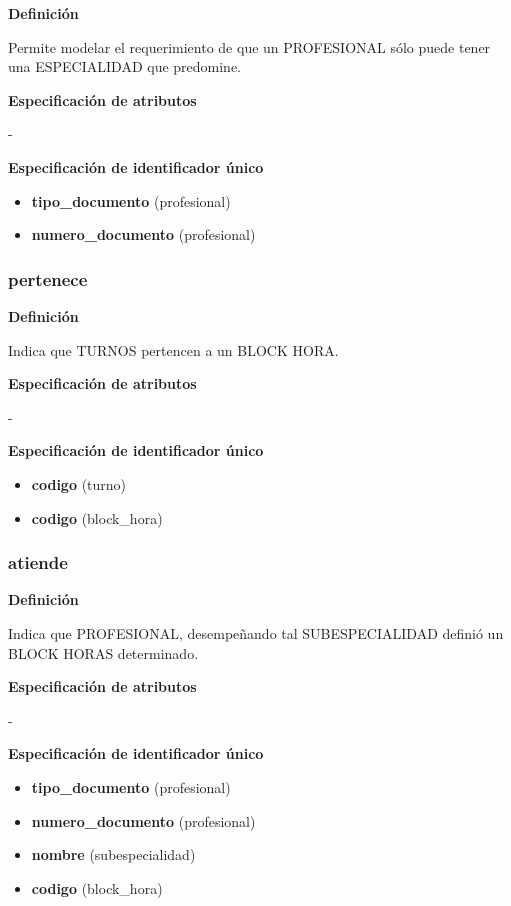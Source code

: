 \documentclass[a4paper,11pt]{article}
\begin{document}
\textbf{Definición}

Permite modelar el requerimiento de que un PROFESIONAL sólo puede tener una ESPECIALIDAD 
que predomine.

\textbf{Especificación de atributos}

-

\textbf{Especificación de identificador único}

\begin{itemize}

     \item \textbf{tipo\_documento} (profesional)

     \item \textbf{numero\_documento} (profesional)

\end{itemize}

\subsubsection{\textbf{pertenece}}

\textbf{Definición}

Indica que TURNOS pertencen a un BLOCK HORA.

\textbf{Especificación de atributos}

-

\textbf{Especificación de identificador único}

\begin{itemize}

     \item \textbf{codigo} (turno)

     \item \textbf{codigo} (block\_hora)

\end{itemize}

\subsubsection{\textbf{atiende}}

\textbf{Definición}

Indica que PROFESIONAL, desempeñando tal SUBESPECIALIDAD definió un BLOCK 
HORAS determinado.

\textbf{Especificación de atributos}

-

\textbf{Especificación de identificador único}

\begin{itemize}

     \item \textbf{tipo\_documento} (profesional)

     \item \textbf{numero\_documento} (profesional)

     \item \textbf{nombre} (subespecialidad)

     \item \textbf{codigo} (block\_hora)

\end{itemize}
\end{document}
